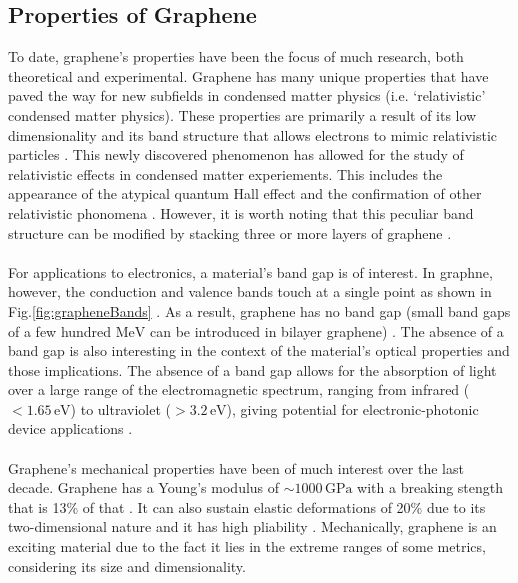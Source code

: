 \documentclass[%
 reprint,
 amsmath,amssymb,
 aps,
pra,
floatfix,
]{revtex4-1}
\begin{document}
\subsection{\label{subsec:properties_graphene} Properties of Graphene}
To date, graphene's properties have been the focus of much research, both theoretical and experimental. Graphene has many unique properties that have paved the way for new subfields in condensed matter physics (i.e. `relativistic' condensed matter physics). These properties are primarily a result of its low dimensionality and its band structure that allows electrons to mimic relativistic particles \cite{Giem2007}. This newly discovered phenomenon has allowed for the study of relativistic effects in condensed matter experiements. This includes the appearance of the atypical quantum Hall effect and the confirmation of other relativistic phonomena \cite{Geim2005_quantum, Zhang2011, Williams2007}. However, it is worth noting that this peculiar band structure can be modified by stacking three or more layers of graphene \cite{nanoscaleReview2011}. 
\\ \\
For applications to electronics, a material's band gap is of interest. In graphne, however, the conduction and valence bands touch at a single point as shown in Fig.\ref{fig:grapheneBands} \cite{Wallace1947, nanoscaleReview2011}. As a result, graphene has no band gap (small band gaps of a few hundred $\textrm{MeV}$ can be introduced in bilayer graphene) \cite{grapheneLike2Dreview2013}. The absence of a band gap is also interesting in the context of the material's optical properties and those implications. The absence of a band gap allows for the absorption of light over a large range of the electromagnetic spectrum, ranging from infrared ($< 1.65 \mathrm{\,eV}$) to ultraviolet ($> 3.2 \mathrm{\,eV}$), giving potential for electronic-photonic device applications \cite{Wang2008, Geim2011, Xia2009}.  
\\ \\
Graphene's mechanical properties have been of much interest over the last decade. Graphene has a Young's modulus of $\sim 1000 \mathrm{\,GPa}$ with a breaking stength that is 13\% of that \cite{Bertolazzi2011, 2DflexibleNanoElectronics2014}. It can also sustain elastic deformations of 20\% due to its two-dimensional nature and it has high pliability \cite{nanoscaleReview2011}. Mechanically, graphene is an exciting material due to the fact it lies in the extreme ranges of some metrics, considering its size and dimensionality. 
\end{document}
